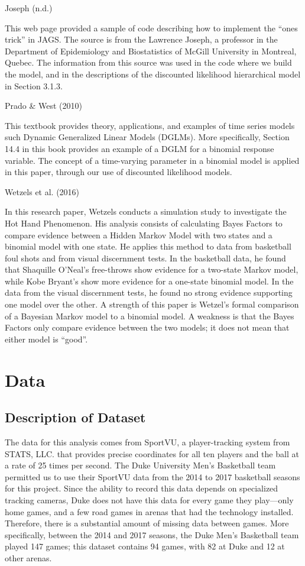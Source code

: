 \documentclass[12pt,twoside]{dukestatscithesis}
\theoremstyle{definition}
\theoremstyle{definition}
\theoremstyle{definition}
\theoremstyle{remark}
\begin{document}
Joseph (n.d.)

This web page provided a sample of code describing how to implement the
``ones trick'' in JAGS. The source is from the Lawrence Joseph, a
professor in the Department of Epidemiology and Biostatistics of McGill
University in Montreal, Quebec. The information from this source was
used in the code where we build the model, and in the descriptions of
the discounted likelihood hierarchical model in Section 3.1.3.

Prado \& West (2010)

This textbook provides theory, applications, and examples of time series
models such Dynamic Generalized Linear Models (DGLMs). More
specifically, Section 14.4 in this book provides an example of a DGLM
for a binomial response variable. The concept of a time-varying
parameter in a binomial model is applied in this paper, through our use
of discounted likelihood models.

Wetzels et al. (2016)

In this research paper, Wetzels conducts a simulation study to
investigate the Hot Hand Phenomenon. His analysis consists of
calculating Bayes Factors to compare evidence between a Hidden Markov
Model with two states and a binomial model with one state. He applies
this method to data from basketball foul shots and from visual
discernment tests. In the basketball data, he found that Shaquille
O'Neal's free-throws show evidence for a two-state Markov model, while
Kobe Bryant's show more evidence for a one-state binomial model. In the
data from the visual discernment tests, he found no strong evidence
supporting one model over the other. A strength of this paper is
Wetzel's formal comparison of a Bayesian Markov model to a binomial
model. A weakness is that the Bayes Factors only compare evidence
between the two models; it does not mean that either model is ``good''.

\chapter{Data}\label{data}

\section{Description of Dataset}\label{description-of-dataset}

The data for this analysis comes from SportVU, a player-tracking system
from STATS, LLC. that provides precise coordinates for all ten players
and the ball at a rate of 25 times per second. The Duke University Men's
Basketball team permitted us to use their SportVU data from the 2014 to
2017 basketball seasons for this project. Since the ability to record
this data depends on specialized tracking cameras, Duke does not have
this data for every game they play---only home games, and a few road
games in arenas that had the technology installed. Therefore, there is a
substantial amount of missing data between games. More specifically,
between the 2014 and 2017 seasons, the Duke Men's Basketball team played
147 games; this dataset contains 94 games, with 82 at Duke and 12 at
other arenas.
\end{document}
